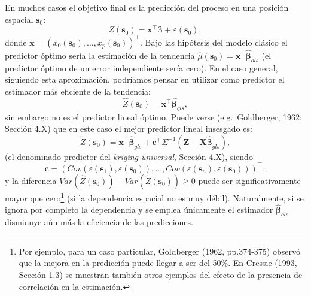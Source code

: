 \documentclass[
  spanish,
]{book}
\theoremstyle{break}
\begin{document}
En muchos casos el objetivo final es la predicción del proceso en una posición espacial \(\mathbf{s}_{0}\):
\[Z(\mathbf{s}_{0} )=\mathbf{x}^{\top}\boldsymbol{\beta}+\varepsilon (\mathbf{s}_{0} ),\]
donde \(\mathbf{x}=\left( x_{0} (\mathbf{s}_{0} ), \ldots,x_{p} (\mathbf{s}_{0})\right)^{\top}\).
Bajo las hipótesis del modelo clásico el predictor óptimo sería la estimación de la tendencia \(\hat{\mu}(\mathbf{s}_{0} ) = \mathbf{x}^{\top}\hat{\boldsymbol{\beta}}_{ols}\) (el predictor óptimo de un error independiente sería cero).
En el caso general, siguiendo esta aproximación, podríamos pensar en utilizar como predictor el estimador más eficiente de la tendencia:
\[\hat{Z} (\mathbf{s}_{0})=\mathbf{x^{\top}}\hat{\boldsymbol{\beta}}_{gls},\]
sin embargo no es el predictor lineal óptimo. Puede verse (e.g.~Goldberger, 1962; Sección 4.X) que en este caso el mejor predictor lineal insesgado es:
\begin{equation} 
  \tilde{Z}(\mathbf{s}_{0}) = \mathbf{x}^{\top}\hat{\boldsymbol{\beta}}_{gls} + \mathbf{c}^{\top} \Sigma^{-1} \left( \mathbf{Z} - \mathbf{X}\hat{\boldsymbol{\beta}}_{gls} \right),
  \label{eq:predictor-kriging}
\end{equation}
(el denominado predictor del \emph{kriging universal}, Sección 4.X), siendo
\[\mathbf{c} = \left( Cov\left( \varepsilon (\mathbf{s}_{1} ),\varepsilon (\mathbf{s}_{0} )\right), \ldots, Cov\left( \varepsilon (\mathbf{s}_{n} ),\varepsilon (\mathbf{s}_{0} )\right) \right)^{\top},\]
y la diferencia \(Var( \hat{Z} (\mathbf{s}_{0} ) ) - Var( \tilde{Z} (\mathbf{s}_{0} ) ) \ge 0\) puede ser significativamente mayor que cero\footnote{Por ejemplo, para un caso particular, Goldberger (1962, pp.374-375) observó que la mejora en la predicción puede llegar a ser del 50\%. En Cressie (1993, Sección 1.3) se muestran también otros ejemplos del efecto de la presencia de correlación en la estimación.} (si la dependencia espacial no es muy débil).
Naturalmente, si se ignora por completo la dependencia y se emplea únicamente el estimador \(\hat{\boldsymbol{\beta}}_{ols}\) disminuye aún más la eficiencia de las predicciones.
\end{document}
